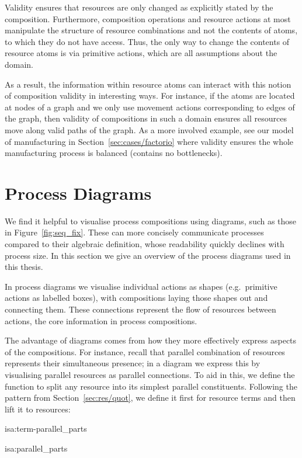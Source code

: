 \documentclass[class=smolathesis,crop=false]{standalone}
\begin{document}
Validity ensures that resources are only changed as explicitly stated by the composition.
Furthermore, composition operations and resource actions at most manipulate the structure of resource combinations and not the contents of atoms, to which they do not have access.
Thus, the only way to change the contents of resource atoms is via primitive actions, which are all assumptions about the domain.

As a result, the information within resource atoms can interact with this notion of composition validity in interesting ways.
For instance, if the atoms are located at nodes of a graph and we only use movement actions corresponding to edges of the graph, then validity of compositions in such a domain ensures all resources move along valid paths of the graph.
As a more involved example, see our model of manufacturing in Section~\ref{sec:cases/factorio} where validity ensures the whole manufacturing process is balanced (\ie contains no bottlenecks).

\section{Process Diagrams}
\label{sec:proc/diag}

We find it helpful to visualise process compositions using diagrams, such as those in Figure~\ref{fig:seq_fix}.
These can more concisely communicate processes compared to their algebraic definition, whose readability quickly declines with process size.
In this section we give an overview of the process diagrams used in this thesis.

In process diagrams we visualise individual actions as shapes (e.g.\ primitive actions as labelled boxes), with compositions laying those shapes out and connecting them.
These connections represent the flow of resources between actions, the core information in process compositions.

The advantage of diagrams comes from how they more effectively express aspects of the compositions.
For instance, recall that parallel combination of resources represents their simultaneous presence; in a diagram we express this by visualising parallel resources as parallel connections.
To aid in this, we define the function  to split any resource into its simplest parallel constituents.
Following the pattern from Section~\ref{sec:res/quot}, we define it first for resource terms and then lift it to resources:
\begin{isadef}{isa:term-parallel_parts}
  
\end{isadef}
\begin{isadef}{isa:parallel_parts}
  
\end{isadef}
\end{document}
